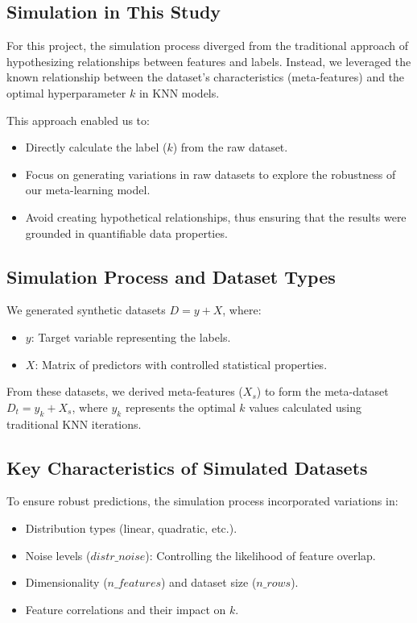 \documentclass[a4paper,11pt]{article}
\begin{document}
\subsection{Simulation in This Study}
For this project, the simulation process diverged from the traditional approach of hypothesizing relationships between features and labels. Instead, we leveraged the known relationship between the dataset's characteristics (meta-features) and the optimal hyperparameter \(k\) in KNN models. 

This approach enabled us to:
\begin{itemize}
    \item Directly calculate the label (\(k\)) from the raw dataset.
    \item Focus on generating variations in raw datasets to explore the robustness of our meta-learning model.
    \item Avoid creating hypothetical relationships, thus ensuring that the results were grounded in quantifiable data properties.
\end{itemize}

\subsection{Simulation Process and Dataset Types}
We generated synthetic datasets \(D = y + X\), where:
\begin{itemize}
    \item \(y\): Target variable representing the labels.
    \item \(X\): Matrix of predictors with controlled statistical properties.
\end{itemize}

From these datasets, we derived meta-features (\(X_s\)) to form the meta-dataset \(D_t = y_k + X_s\), where \(y_k\) represents the optimal \(k\) values calculated using traditional KNN iterations.

\subsection{Key Characteristics of Simulated Datasets}
To ensure robust predictions, the simulation process incorporated variations in:
\begin{itemize}
    \item Distribution types (linear, quadratic, etc.).
    \item Noise levels (\(distr\_noise\)): Controlling the likelihood of feature overlap.
    \item Dimensionality (\(n\_features\)) and dataset size (\(n\_rows\)).
    \item Feature correlations and their impact on \(k\).
\end{itemize}
\end{document}
